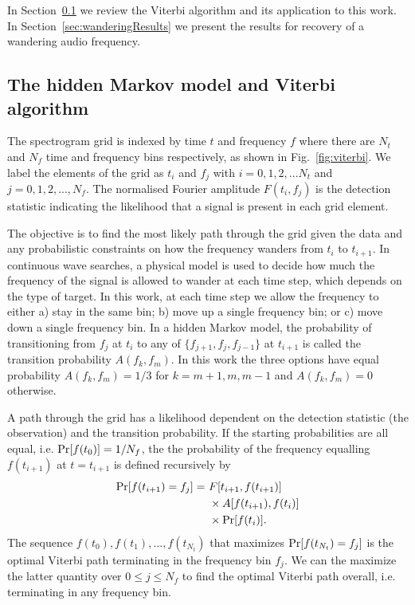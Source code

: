 \documentclass[paper-main.tex]{subfiles}
\begin{document}
In Section~\ref{sec:viterbi} we review the Viterbi algorithm and its application to this work. 
In Section~\ref{sec:wanderingResults} we present the results for recovery of a wandering audio frequency. 




\subsection{The hidden Markov model and Viterbi algorithm}
\label{sec:viterbi}



The spectrogram grid is indexed by time $t$ and frequency $f$ where there are $N_t$ and $N_f$ time and frequency bins respectively, as shown in Fig.~\ref{fig:viterbi}.
We label the elements of the grid as $t_i$ and $f_j$ with $i=0,1,2,...N_t$ and $j=0,1,2,...,N_f$. 
The normalised Fourier amplitude $F(t_i,f_j)$ is the detection statistic indicating the likelihood that a signal is present in each grid element. 


The objective is to find the most likely path through the grid given the data and any probabilistic constraints on how the frequency wanders from $t_i$ to $t_{i+1}$. 
In continuous wave searches, a physical model is used to decide how much the frequency of the signal is allowed to wander at each time step, which depends on the type of target. 
In this work, at each time step we allow the frequency to either a) stay in the same bin; b) move up a single frequency bin; or c) move down a single frequency bin. 
In a hidden Markov model, the probability of transitioning from $f_j$ at $t_i$ to any of $\{f_{j+1},f_j,f_{j-1}\}$ at $t_{i+1}$ is called the transition probability $A(f_k,f_m)$. 
In this work the three options have equal probability $A(f_k,f_m)=1/3$ for $k=m+1,m,m-1$ and $A(f_k,f_m)=0$ otherwise.


A path through the grid has a likelihood dependent on the detection statistic (the observation) and the transition probability.
If the starting probabilities are all equal, i.e. ${\rm Pr}[f(t_0)] = 1/N_f$, the the probability of the frequency equalling $f(t_{i+1})$ at $t = t_{i+1}$ is defined recursively by
\begin{eqnarray}
{\rm Pr}[f(t_{i+1})=f_j] =~& F[t_{i+1},f(t_{i+1})] \nonumber \\
                     &\times A[f(t_{i+1}),f(t_i)]  \nonumber \\
                     &\times {\rm Pr}[f(t_i)].
\label{eqn:recursiveViterbi}
\end{eqnarray}
The sequence $f(t_0),f(t_1),\dots,f(t_{N_t})$ that maximizes ${\rm Pr}[f(t_{N_t}) = f_j]$ is the optimal Viterbi path terminating in the frequency bin $f_j$. 
We can the maximize the latter quantity over $0 \leq j \leq N_f$ to find the optimal Viterbi path overall, i.e. terminating in any frequency bin. 
\end{document}
